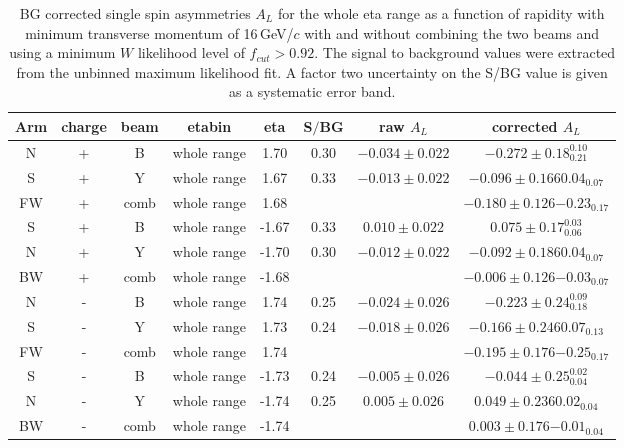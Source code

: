 \begin{table}
\begin{center}
\caption{BG corrected single spin asymmetries $A_L$ for the whole eta range as a function of rapidity with minimum transverse momentum of 
16\,GeV/$c$ with and without combining the two beams and using a minimum $W$ likelihood level of $f_{cut} > 0.92$. 
The signal to background values were extracted from the unbinned maximum likelihood fit. A factor two uncertainty on the 
S/BG value is given as a systematic error band.\label{Tab:Dat:finalasywholeeta}}
\begin{tabular}{|c c c |c c | c|c| c|}
\hline 
Arm & charge & beam & etabin &  eta & S$/$BG & raw $A_L$ & corrected  $A_L$ \\ \hline   
  N &     +  &   B  &  whole range  &  1.70 & 0.30 & $-0.034\pm  0.022$ & $  -0.272\pm  0.18 ^{0.10} _{0.21} $\\
  S &     +  &   Y  & whole range &  1.67 & 0.33 & $-0.013\pm  0.022$ & $ -0.096 \pm 0.16 6{0.04} _{0.07}$ \\ 
 FW &     +  & comb & whole range &  1.68 & &&$  -0.180 \pm 0.12 6{ -0.23} _{0.17} $\\ \hline 
  S &     +  &   B  & whole range  & -1.67 & 0.33 & $ 0.010\pm  0.022$ & $   0.075\pm  0.17 ^{0.03} _{0.06} $\\
  N &     +  &   Y  & whole range  & -1.70 & 0.30 & $-0.012\pm  0.022$ & $ -0.092 \pm 0.18 6{0.04} _{0.07}$ \\ 
 BW &     +  & comb & whole range  & -1.68 & &&$  -0.006 \pm 0.12 6{ -0.03} _{0.07} $\\ \hline 
  N &     -  &   B  & whole range  &  1.74 & 0.25 & $-0.024\pm  0.026$ & $  -0.223\pm  0.24 ^{0.09} _{0.18} $\\
  S &     -  &   Y  & whole range  &  1.73 & 0.24 & $-0.018\pm  0.026$ & $ -0.166 \pm 0.24 6{0.07} _{0.13}$ \\ 
 FW &     -  & comb & whole range  &  1.74 & &&$  -0.195 \pm 0.17 6{ -0.25} _{0.17} $\\ \hline 
  S &     -  &   B  & whole range  & -1.73 & 0.24 & $-0.005\pm  0.026$ & $  -0.044\pm  0.25 ^{0.02} _{0.04} $\\
  N &     -  &   Y  & whole range  & -1.74 & 0.25 & $ 0.005\pm  0.026$ & $  0.049 \pm 0.23 6{0.02} _{0.04}$ \\ 
 BW &     -  & comb & whole range  & -1.74 & &&$   0.003 \pm 0.17 6{ -0.01} _{0.04} $\\ \hline 

\end{tabular}
\end{center}
\end{table}
